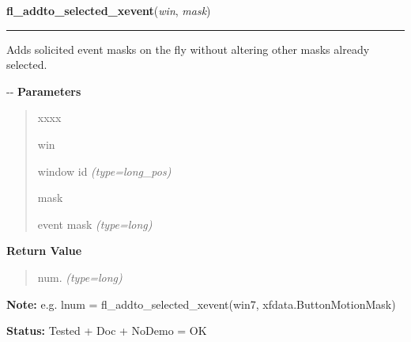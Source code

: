 \hspace{.8\funcindent}\begin{boxedminipage}{\funcwidth}

    \raggedright \textbf{fl\_addto\_selected\_xevent}(\textit{win}, \textit{mask})

    \vspace{-1.5ex}

    \rule{\textwidth}{0.5\fboxrule}
\setlength{\parskip}{2ex}

Adds solicited event masks on the fly without altering other masks
already selected.

-{}-
\setlength{\parskip}{1ex}
      \textbf{Parameters}
      \vspace{-1ex}

      \begin{quote}
        \begin{Ventry}{xxxx}

          \item[win]


window id
            {\it (type=long\_pos)}

          \item[mask]


event mask
            {\it (type=long)}

        \end{Ventry}

      \end{quote}

      \textbf{Return Value}
    \vspace{-1ex}

      \begin{quote}

num.
      {\it (type=long)}

      \end{quote}

\textbf{Note:} 
e.g. lnum = fl\_addto\_selected\_xevent(win7,         xfdata.ButtonMotionMask)


\textbf{Status:} 
Tested + Doc + NoDemo = OK


    \end{boxedminipage}

    \label{xformslib:flxbasic:fl_remove_selected_xevent}

    \vspace{0.5ex}

